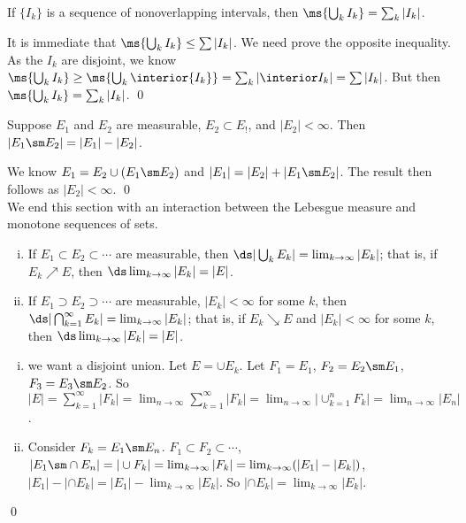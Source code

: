 \begin{cor}
If $\{I_k\}$ is a sequence of nonoverlapping intervals, then $\ms{\bigcup_k I_k}= \sum_k |I_k|$. 
\end{cor}

\pf It is immediate that $\ms{\bigcup_k I_k} \leq \sum |I_k|$. We need prove the opposite inequality. As the $I_k$ are disjoint, we know $\ms{\bigcup_k I_k} \geq \ms{\bigcup_k \interior{I_k}}= \sum_k |\interior I_k|= \sum |I_k|$. But then $\ms{\bigcup_k I_k}= \sum_k |I_k|$. \qed \\


\begin{cor}
Suppose $E_1$ and $E_2$ are measurable, $E_2 \subset E_!$, and $|E_2|<\infty$. Then $|E_1 \sm E_2|= |E_1| - |E_2|$. 
\end{cor}

\pf We know $E_1= E_2 \cup (E_1 \sm E_2)$ and $|E_1|= |E_2| + |E_1 \sm E_2|$. The result then follows as $|E_2|<\infty$. \qed \\


We end this section with an interaction between the Lebesgue measure and monotone sequences of sets.


\begin{prop} \hfill
\begin{enumerate}[(i)]
\item If $E_1 \subset E_2 \subset \cdots$ are measurable, then $\ds|\bigcup_k E_k|= \lim_{k \to \infty} |E_k|$; that is, if $E_k \nearrow E$, then $\ds\lim_{k \to \infty} |E_k|=|E|$.
\item If $E_1 \supset E_2 \supset \cdots$ are measurable, $|E_k|<\infty$ for some $k$, then $\ds|\bigcap_{k=1}^\infty E_k|= \lim_{k \to \infty} |E_k|$; that is, if $E_k \searrow E$ and $|E_k|<\infty$ for some $k$, then $\ds\lim_{k \to \infty} |E_k|=|E|$. 
\end{enumerate}
\end{prop}

\pf \hfill
\begin{enumerate}[(i)]
\item

we want a disjoint union. Let $E= \cup E_k$. Let $F_1= E_1$, $F_2= E_2 \sm E_1$, $F_3= E_3 \sm E_2$. So $|E|= \sum_{k=1}^\infty |F_k|= \lim_{n \to \infty} \sum_{k=1}^\infty |F_k|= \lim_{n \to \infty} |\cup_{k=1}^n F_k|= \lim_{n \to \infty} |E_n|$.

\item

Consider $F_k=E_1 \sm E_n$. $F_1 \subset F_2 \subset \cdots$, $|E_1 \sm \cap E_n|= |\cup F_k|= \lim_{k \to \infty} |F_k|= \lim_{k \to \infty} (|E_1| - |E_k|)$, $|E_1|- |\cap E_k|= |E_1| - \lim_{k \to \infty} |E_k|$. So $|\cap E_k|= \lim_{k \to \infty} |E_k|$. 

\end{enumerate} \qed \\


